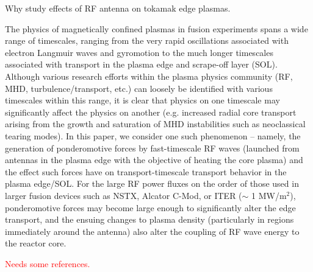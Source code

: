 
Why study effects of RF antenna on tokamak edge plasmas.

The physics of magnetically confined plasmas in fusion experiments spans a wide range of
timescales, ranging from the very rapid oscillations associated with electron
Langmuir waves and gyromotion to the much longer timescales associated with
transport in the plasma edge and scrape-off layer (SOL).  Although various research efforts
within the plasma physics community (RF, MHD, turbulence/transport, etc.) can
loosely be identified with various timescales within this range, it
is clear that physics on one timescale may significantly affect the physics on another
(e.g. increased radial core transport arising from the growth and saturation of MHD
instabilities such as neoclassical tearing modes).  In this paper, we consider one such
phenomenon -- namely, the generation of ponderomotive forces by fast-timescale RF waves
(launched from antennas in the plasma edge with the objective of heating the core plasma)
and the effect such forces have on transport-timescale transport behavior in the plasma edge/SOL.
For the large RF power fluxes on the order of those used in larger fusion devices such as NSTX,
Alcator C-Mod, or ITER ($\sim$ 1 MW/m$^{2}$), ponderomotive forces may become large enough
to significantly alter the edge transport, and the ensuing changes to plasma density (particularly
in regions immediately around the antenna) also alter the coupling of RF wave energy to the reactor core.

\textcolor{red}{Needs some references.}

